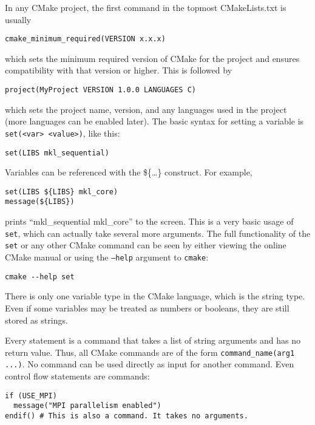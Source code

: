 In any CMake project, the first command in the topmost CMakeLists.txt is usually
\begin{verbatim}
cmake_minimum_required(VERSION x.x.x)
\end{verbatim}
which sets the minimum required version of CMake for the project and ensures compatibility with that version or higher. This is followed by
\begin{verbatim}
project(MyProject VERSION 1.0.0 LANGUAGES C)
\end{verbatim}
which sets the project name, version, and any languages used in the project (more languages can be enabled later). The basic syntax for setting a variable is \texttt{set(<var> <value>)}, like this:
\begin{verbatim}
set(LIBS mkl_sequential)
\end{verbatim}
Variables can be referenced with the \$\{\ldots\} construct. For example,
\begin{verbatim}
set(LIBS ${LIBS} mkl_core)
message(${LIBS})
\end{verbatim}
prints ``mkl\_sequential mkl\_core'' to the screen. This is a very basic usage of \texttt{set}, which can actually take several more arguments. The full functionality of the \texttt{set} or any other CMake command can be seen by either viewing the online CMake manual or using the \texttt{--help} argument to \texttt{cmake}:
\begin{verbatim}
cmake --help set
\end{verbatim}

There is only one variable type in the CMake language, which is the string type. Even if some variables may be treated as numbers or booleans, they are still stored as strings.

Every statement is a command that takes a list of string arguments and has no return value. Thus, all CMake commands are of the form \texttt{command\_name(arg1 ...)}. No command can be used directly as input for another command. Even control flow statements are commands:
\begin{verbatim}
if (USE_MPI)
  message("MPI parallelism enabled")
endif() # This is also a command. It takes no arguments.
\end{verbatim}

